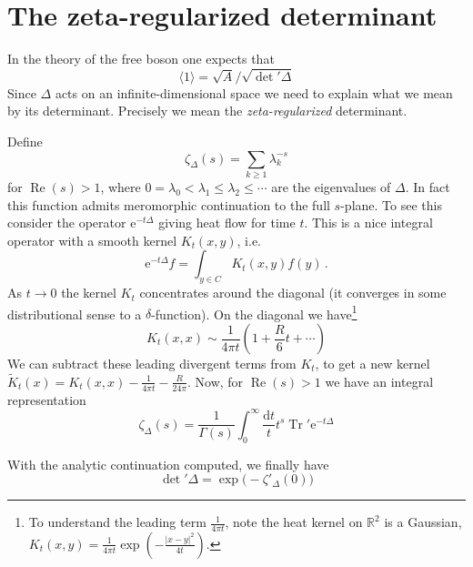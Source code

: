 \documentclass[12pt,letterpaper,reqno]{amsart}
\numberwithin{equation}{section}
\newcommand{\bbR}{\ensuremath{\mathbb R}}
\newcommand{\e}{{\mathrm e}}
\newcommand{\de}{\mathrm{d}}
\newcommand{\abs}[1]{\lvert#1\rvert}
\newcommand{\IP}[1]{\langle#1\rangle}
\newcommand{\ti}[1]{\textit{#1}}
\DeclareMathOperator{\re}{Re}
\DeclareMathOperator{\Tr}{Tr}
\begin{document}
\section{The zeta-regularized determinant} \label{sec:zeta-determinant}
 
In the theory of the free boson one expects that
\begin{equation}
  \IP{1} = \sqrt{A} / \sqrt{\det{}' \Delta}
\end{equation}
Since $\Delta$ acts on an infinite-dimensional space we need to explain what we mean by
its determinant.
Precisely we mean the \ti{zeta-regularized} determinant.

Define 
\begin{equation}
 \zeta_\Delta(s) = \sum_{k \ge1 }\lambda_k^{-s} 
\end{equation}
for
$\re(s) > 1$, where $0=\lambda_0<\lambda_1\le\lambda_2\le\cdots$ are the eigenvalues of $\Delta$.
In fact this function admits meromorphic continuation to the full
$s$-plane. To see this consider the operator $\e^{-t \Delta}$ 
giving heat flow for time $t$. This is a nice
integral operator with a smooth kernel $K_t(x,y)$, i.e.
\begin{equation}
  \e^{-t \Delta} f = \int_{y \in C} K_t(x,y) f(y) \, .
\end{equation}
As $t \to 0$ the kernel $K_t$ 
concentrates around the diagonal (it converges in some distributional sense to a $\delta$-function). On the diagonal we have\footnote{To understand the leading term $\frac{1}{4 \pi t}$, note the heat kernel on $\bbR^2$ is a Gaussian, $K_t(x,y) = \frac{1}{4 \pi t} \exp\left(- \frac{\abs{x-y}^2}{4t} \right)$.}
\begin{equation}
  K_t(x,x) \sim \frac{1}{4 \pi t} \left(1 + \frac{R}{6} t + \cdots\right)
\end{equation}
We can subtract these leading divergent terms from $K_t$,
to get a new kernel $\widetilde K_t(x) = K_t(x,x) - \frac{1}{4 \pi t} - \frac{R}{24 \pi}$.
Now, for $\re(s) > 1$ we have an integral representation
\begin{equation}
  \zeta_\Delta(s) = \frac{1}{\Gamma(s)} \int_0^\infty \frac{\de t}{t} t^s \Tr{}' \e^{-t \Delta}
\end{equation}

With the analytic continuation computed, we finally have
\begin{equation}
\det{}'\Delta = \exp\big(-\zeta'_{\Delta}(0)\big)
\end{equation}




\printbibliography
\end{document}
